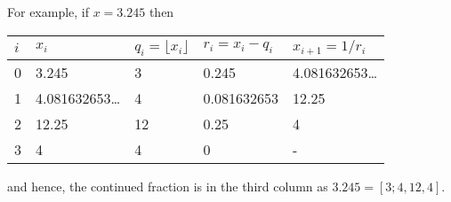 For example, if $x=3.245$ then
\begin{center}
  \begin{tabular}{|l|l|l|l|l|}
    \hline
    $i$ & $x_i$ & $q_i = \lfloor x_i \rfloor$ & $r_i = x_i - q_i$ & $x_{i+1}=1/r_i$\\
    \hline
    0 & 3.245 & 3 & 0.245 & 4.081632653\ldots\\
    1 & 4.081632653\ldots & 4 & 0.081632653 & 12.25\\
    2 & 12.25 & 12 & 0.25 & 4\\
    3 & 4 & 4 & 0 & -\\
    \hline
  \end{tabular}
\end{center}
and hence, the continued fraction is in the third column as $3.245 = [3; 4, 12, 4]$.




